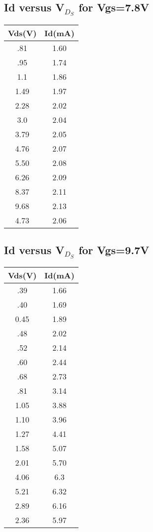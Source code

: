 \documentclass[12pt]{extarticle}
\begin{document}
\subsection{Id versus V$_D_S$ for Vgs=7.8V}
\begin{center}
 \begin{tabular}{|| c | c||} 
 \hline
 Vds(V) & Id(mA) \\ [0.5ex] 
 \hline\hline
 .81&1.60\\
 \hline
 .95&1.74\\
 \hline
 1.1&1.86\\
 \hline
 1.49&1.97\\
 \hline
 2.28&2.02\\
 \hline
 3.0&2.04\\
 \hline
 3.79&2.05\\
 \hline
 4.76&2.07\\
 \hline
 5.50&2.08\\
 \hline
 6.26&2.09\\
 \hline
 8.37&2.11\\
 \hline
 9.68&2.13\\
 \hline
 4.73&2.06\\
 \hline
\end{tabular}
\end{center}

\subsection{Id versus V$_D_S$ for Vgs=9.7V}
\begin{center}
 \begin{tabular}{|| c | c||} 
 \hline
 Vds(V) & Id(mA) \\ [0.5ex] 
 \hline\hline
 .39&1.66\\
 \hline
 .40&1.69\\
 \hline
 0.45&1.89\\
 \hline
 .48&2.02\\
 \hline
 .52&2.14\\
 \hline
 .60&2.44\\
 \hline
 .68&2.73\\
 \hline
 .81&3.14\\
 \hline
 1.05&3.88\\
 \hline
 1.10&3.96\\
 \hline
 1.27&4.41\\
 \hline
 1.58&5.07\\
 \hline
 2.01&5.70\\
 \hline
 4.06&6.3\\
 \hline
 5.21&6.32\\
 \hline
 2.89&6.16\\
 \hline
 2.36&5.97\\
 \hline
\end{tabular}
\end{center}
\end{document}
